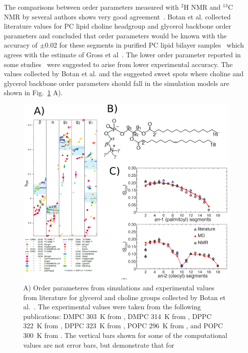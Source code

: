 \documentclass[aps,prl,superscriptaddress,twocolumn]{revtex4}
\begin{document}
The comparisons between order parameters measured with $^2$H NMR and $^{13}$C NMR by several authors
shows very good agreement~\cite{gross97,dvinskikh05a,ferreira13, botan15}.
Botan et al. collected literature values for PC lipid choline headgroup and glycerol backbone order parameters 
and concluded that order parameters would be known with the accuracy of $\pm$0.02 for these segments in purified PC lipid bilayer samples~\cite{botan15}
which agrees with the estimate of Gross et al~\cite{gross97}. 
The lower order parameter reported in some studies~\cite{hong95a,hong95b,warschawski05} were suggested to arise from lower experimental accuracy.
The values collected by Botan et al. and the suggested sweet spots where choline and glycerol backbone order parameters should fall in the 
simulation models are shown in Fig.~\ref{allOPs} A).
\begin{figure}[]
  \includegraphics[width=17.2cm]{../Fig/allOPs.eps}
  \caption{\label{allOPs}
    A)  Order parameteres from simulations and experimental values from literature for glycerol and choline groups collected by Botan et al.~\cite{botan15}.
    The experimental values were taken from the following publications:
    DMPC 303~K from \cite{gross97},
    DMPC 314~K from \cite{dvinskikh05a},
    DPPC 322~K from \cite{gally75},
    DPPC 323~K from \cite{akutsu81},
    POPC 296~K from \cite{bechinger91}, and
    POPC 300~K from \cite{ferreira13}.
    The vertical bars shown for some of the computational values are not error bars, but demonstrate that for 
}
\end{figure}
\end{document}
